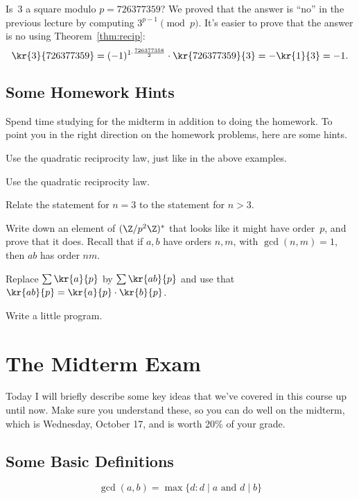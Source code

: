 \documentclass[11pt]{report}
\newenvironment{subprob}
   {\begin{list}{(\roman{thesubprob})}{\usecounter{thesubprob}}}
   {\end{list}}
\begin{document}
\begin{example}
  Is~$3$ a square modulo $p=726377359$?  We proved that the answer is ``no''
  in the previous lecture by computing $3^{p-1}\pmod{p}$.  It's easier to
  prove that the answer is no using Theorem~\ref{thm:recip}:
  $$
    \kr{3}{726377359}
    = (-1)^{1\cdot \frac{726377358}{2}}\cdot \kr{726377359}{3}
    = -\kr{1}{3} = -1.
  $$
\end{example}



\section{Some Homework Hints}
Spend time studying for the midterm in addition to doing the homework.
To point you in the right direction on the homework problems, here
are some hints.
\begin{subprob}
  \item Use the quadratic reciprocity law, just like in the above examples.
  \item Use the quadratic reciprocity law.
  \item Relate the statement for $n=3$ to the statement for $n>3$.
  \item Write down an element of $(\Z/p^2\Z)^*$ that looks like it might
  have order~$p$, and prove that it does.  Recall that if $a, b$
  have orders $n, m$, with $\gcd(n,m)=1$, then $ab$ has order $nm$.
  \item
  \item
  \item Replace $\sum\kr{a}{p}$ by $\sum \kr{ab}{p}$ and use that
  $\kr{ab}{p}=\kr{a}{p}\cdot \kr{b}{p}$.
  \item Write a little program.
\end{subprob}







\chapter{The Midterm Exam}

Today I will briefly describe some key ideas that we've covered in
this course up until now.  Make sure you understand these, so you can
do well on the midterm, which is Wednesday, October 17, and is worth
20\% of your grade.

\section{Some Basic Definitions}
$$\gcd(a,b) = \max\{ d : d \mid a \text{ and } d \mid b\}$$
\end{document}
